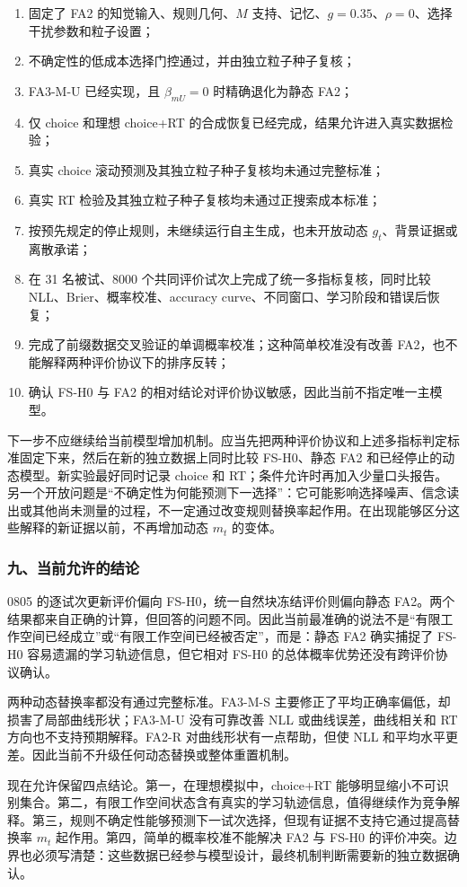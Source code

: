 \begin{enumerate}
    \item 固定了 FA2 的知觉输入、规则几何、$M$ 支持、记忆、$g=0.35$、$\rho=0$、选择干扰参数和粒子设置；
    \item 不确定性的低成本选择门控通过，并由独立粒子种子复核；
    \item FA3-M-U 已经实现，且 $\beta_{mU}=0$ 时精确退化为静态 FA2；
    \item 仅 choice 和理想 choice+RT 的合成恢复已经完成，结果允许进入真实数据检验；
    \item 真实 choice 滚动预测及其独立粒子种子复核均未通过完整标准；
    \item 真实 RT 检验及其独立粒子种子复核均未通过正搜索成本标准；
    \item 按预先规定的停止规则，未继续运行自主生成，也未开放动态 $g_t$、背景证据或离散承诺；
    \item 在 31 名被试、8000 个共同评价试次上完成了统一多指标复核，同时比较 NLL、Brier、概率校准、accuracy curve、不同窗口、学习阶段和错误后恢复；
    \item 完成了前缀数据交叉验证的单调概率校准；这种简单校准没有改善 FA2，也不能解释两种评价协议下的排序反转；
    \item 确认 FS-H0 与 FA2 的相对结论对评价协议敏感，因此当前不指定唯一主模型。
\end{enumerate}

下一步不应继续给当前模型增加机制。应当先把两种评价协议和上述多指标判定标准固定下来，然后在新的独立数据上同时比较 FS-H0、静态 FA2 和已经停止的动态模型。新实验最好同时记录 choice 和 RT；条件允许时再加入少量口头报告。另一个开放问题是“不确定性为何能预测下一选择”：它可能影响选择噪声、信念读出或其他尚未测量的过程，不一定通过改变规则替换率起作用。在出现能够区分这些解释的新证据以前，不再增加动态 $m_t$ 的变体。


\subsubsection{九、当前允许的结论}

0805 的逐试次更新评价偏向 FS-H0，统一自然块冻结评价则偏向静态 FA2。两个结果都来自正确的计算，但回答的问题不同。因此当前最准确的说法不是“有限工作空间已经成立”或“有限工作空间已经被否定”，而是：静态 FA2 确实捕捉了 FS-H0 容易遗漏的学习轨迹信息，但它相对 FS-H0 的总体概率优势还没有跨评价协议确认。

两种动态替换率都没有通过完整标准。FA3-M-S 主要修正了平均正确率偏低，却损害了局部曲线形状；FA3-M-U 没有可靠改善 NLL 或曲线误差，曲线相关和 RT 方向也不支持预期解释。FA2-R 对曲线形状有一点帮助，但使 NLL 和平均水平更差。因此当前不升级任何动态替换或整体重置机制。

现在允许保留四点结论。第一，在理想模拟中，choice+RT 能够明显缩小不可识别集合。第二，有限工作空间状态含有真实的学习轨迹信息，值得继续作为竞争解释。第三，规则不确定性能够预测下一试次选择，但现有证据不支持它通过提高替换率 $m_t$ 起作用。第四，简单的概率校准不能解决 FA2 与 FS-H0 的评价冲突。边界也必须写清楚：这些数据已经参与模型设计，最终机制判断需要新的独立数据确认。
